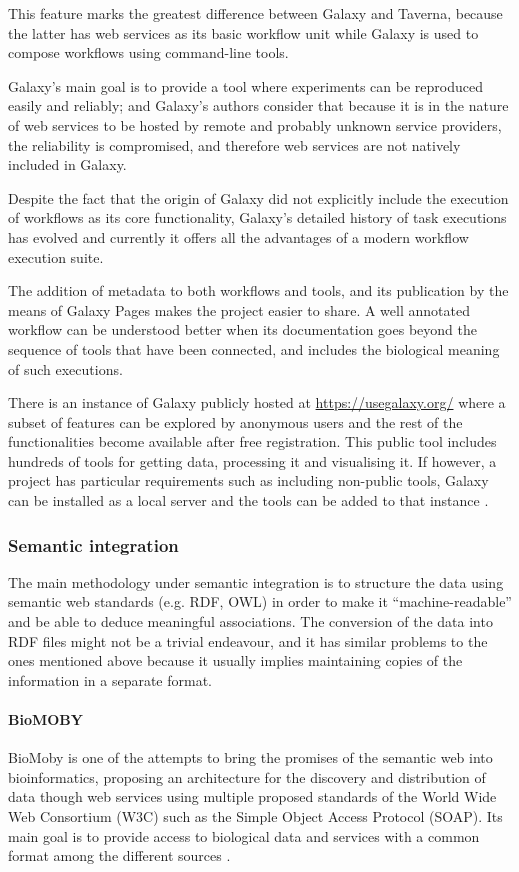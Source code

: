 This feature marks the greatest difference between Galaxy and Taverna, because the latter has web services as its basic workflow unit while Galaxy is used to compose workflows using command-line tools.

Galaxy's main goal is to provide a tool where experiments can be reproduced easily and reliably; and Galaxy's authors consider that because it is in the nature of web services to be hosted by remote and probably unknown service providers, the reliability is compromised, and therefore web services are not natively included in Galaxy.

Despite the fact that the origin of Galaxy did not explicitly include the execution of workflows as its core functionality, Galaxy's detailed history of task executions has evolved and currently it offers all the advantages of a modern workflow execution suite.

The addition of metadata to both workflows and tools, and its publication by the means of Galaxy Pages makes the project easier to share. A well annotated workflow can be understood better when its documentation goes beyond the sequence of tools that have been connected, and includes the biological meaning of such executions.

There is an instance of Galaxy publicly hosted at \url{https://usegalaxy.org/} where a subset of features can be explored by anonymous users and the rest of the functionalities become available after free registration. This public tool includes hundreds of tools for getting data, processing it and visualising it. If however, a project has particular requirements such as including non-public tools, Galaxy can be installed as a local server and the tools can be added to that instance \cite{GIA2005, GOE2010}.


\subsubsection{Semantic integration} 
The main methodology under semantic integration is to structure the data using semantic web standards (e.g. RDF, OWL) in order to make it ``machine-readable'' and be able to deduce meaningful associations. The conversion of the data into RDF files might not be a trivial endeavour, and it has similar problems to the ones mentioned above because it usually implies maintaining copies of the information in a separate format. 

\paragraph{BioMOBY}
BioMoby is one of the attempts to bring the promises of the semantic web into bioinformatics, proposing an architecture for the discovery and distribution of data though web services using multiple proposed standards of the World Wide Web Consortium (W3C) such as the Simple Object Access Protocol (SOAP). Its main goal is to provide access to biological data and services with a common format among the different sources \cite{WIL2002}.

